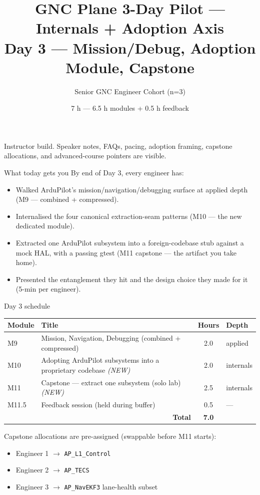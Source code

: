 \documentclass[aspectratio=169,11pt]{beamer}
\title{GNC Plane 3-Day Pilot --- Internals + Adoption Axis\\\large Day 3 --- Mission/Debug, Adoption Module, Capstone}
\subtitle{Senior GNC Engineer Cohort (n=3)}
\date{7 h --- 6.5 h modules + 0.5 h feedback}
\author{}
\institute{\copyrightline}
\begin{document}
\begin{frame}
  \titlepage
  \ifinstructor
    \footnotesize Instructor build. Speaker notes, FAQs, pacing, adoption framing, capstone allocations, and advanced-course pointers are visible.
  \fi
\end{frame}

\begin{frame}[allowframebreaks]{What today gets you}
  By end of Day 3, every engineer has:
  \begin{itemize}
    \item Walked ArduPilot's mission/navigation/debugging surface at applied depth (M9 --- combined + compressed).
    \item Internalised the four canonical extraction-seam patterns (M10 --- the new dedicated module).
    \item Extracted one ArduPilot subsystem into a foreign-codebase stub against a mock HAL, with a passing gtest (M11 capstone --- the artifact you take home).
    \item Presented the entanglement they hit and the design choice they made for it (5-min per engineer).
  \end{itemize}
\end{frame}

\begin{frame}{Day 3 schedule}
  \begin{center}\small
  \begin{tabular}{|l|l|c|l|}\hline
  Module & Title & Hours & Depth \\ \hline
  M9 & Mission, Navigation, Debugging (combined + compressed) & 2.0 & applied \\ \hline
  M10 & Adopting ArduPilot subsystems into a proprietary codebase \emph{(NEW)} & 2.0 & internals \\ \hline
  M11 & Capstone --- extract one subsystem (solo lab) \emph{(NEW)} & 2.5 & internals \\ \hline
  M11.5 & Feedback session (held during buffer) & 0.5 & --- \\ \hline
  \multicolumn{2}{|r|}{\textbf{Total}} & \textbf{7.0} & \\ \hline
  \end{tabular}
  \end{center}
  \vfill
  Capstone allocations are pre-assigned (swappable before M11 starts):
  \begin{itemize}
    \item Engineer 1 $\rightarrow$ \texttt{AP\_L1\_Control}
    \item Engineer 2 $\rightarrow$ \texttt{AP\_TECS}
    \item Engineer 3 $\rightarrow$ \texttt{AP\_NavEKF3} lane-health subset
  \end{itemize}
\end{frame}
\end{document}
